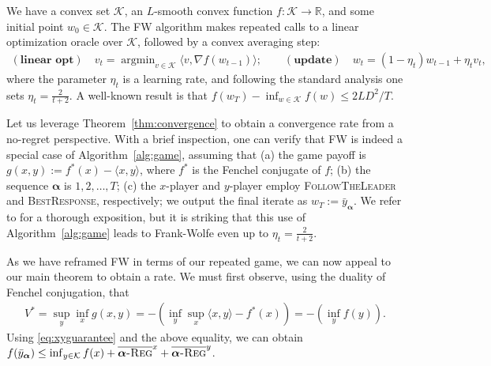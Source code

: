 \documentclass[final,12pt]{colt2018} %
\def\reals{\mathbb{R}}
\def\reals{\mathbb{R}}
\def\K{\mathcal{K}}
\def\argmin{\mathop{\arg\min}}
\def\balpha{\boldsymbol{\alpha}}
\def\FTL{\textsc{FollowTheLeader}\xspace}
\def\BR{\textsc{BestResponse}\xspace}
\newcommand{\avgregret}[1]{\overline{\balpha\textsc{-Reg}}^{#1}}
\begin{document}
We have a convex set $\K$, an $L$-smooth convex function $f : \K \to \reals$, and some initial point $w_0 \in \K$.
The FW algorithm makes repeated calls to a linear optimization oracle over $\K$, followed by a convex averaging step:
\begin{equation*}
\begin{aligned}
\textstyle(\textbf{linear opt}) \quad v_t = \argmin_{v \in \K} \langle v, \nabla f(w_{t-1})  \rangle; \quad \quad (\textbf{update}) \quad  w_{t} = (1 - \eta_t) w_{t-1} + \eta_t v_t,
\end{aligned}
\end{equation*}
where the parameter $\eta_t$ is a learning rate, and following the standard analysis one sets $\eta_t = \frac 2 {t + 2}$. A well-known result is that $f(w_T) - \inf_{w \in \K} f(w) \leq {2L D^2}/{T}$.

Let us leverage Theorem~\ref{thm:convergence} to obtain a convergence rate from a no-regret perspective. With a brief inspection, one can verify that FW is indeed a special case of Algorithm~\ref{alg:game}, assuming that (a) the game payoff is $g(x,y) := f^*(x) - \langle x, y \rangle$, where $f^*$ is the Fenchel conjugate of $f$; (b) the sequence $\balpha$ is $1, 2, \ldots, T$; (c) the $x$-player and $y$-player employ \FTL and \BR, respectively; we output the final iterate as $w_T := \bar y_{\balpha}$. We refer to \citet{AW17} for a thorough exposition, but it is striking that this use of Algorithm~\ref{alg:game} leads to Frank-Wolfe even up to $\eta_t = \frac{2}{t+2}$.

As we have reframed FW in terms of our repeated game, we can now appeal to our main theorem to obtain a rate. We must first observe, using the duality of Fenchel conjugation, that 
\begin{align}
\textstyle	V^* = \sup_y \inf_x  g(x,y) = - (\inf_y \sup_x  \langle x, y \rangle - f^*(x)) = - (\inf_y f(y)).\label{eq:fwgamevalue}
\end{align}
Using \eqref{eq:xyguarantee} and the above equality, we can obtain $f(\bar y_{\balpha}) \leq \inf_{y \in \K} f(x) + \avgregret{x} + \avgregret{y}$.
\end{document}
